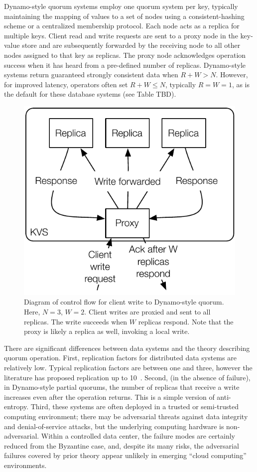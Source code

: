 \documentclass{vldb}
\begin{document}
Dynamo-style quorum systems employ one quorum system per key,
typically maintaining the mapping of values to a set of nodes using a
consistent-hashing scheme or a centralized membership protocol. Each
node acts as a replica for multiple keys.  Client read and write
requests are sent to a proxy node in the key-value store and are
subsequently forwarded by the receiving node to all other nodes
assigned to that key as replicas.  The proxy node acknowledges
operation success when it has heard from a pre-defined number of
replicas.  Dynamo-style systems return guaranteed strongly consistent
data when $R+W > N$.  However, for improved latency, operators often
set $R+W \leq N$, typically $R=W=1$, as is the default for these
database systems (see Table TBD).

\begin{figure}
\centering
\includegraphics[width=.8\columnwidth]{figs/dynamo-quorum.pdf}
\caption{Diagram of control flow for client write to Dynamo-style
  quorum.  Here, $N=3$, $W=2$. Client writes are proxied and sent to
  all replicas. The write succeeds when $W$ replicas respond.  Note
  that the proxy is likely a replica as well, invoking a local write.}
\label{fig:dynamo-quorum}
\end{figure}

There are significant differences between data systems and the theory
describing quorum operation.  First, replication factors for
distributed data systems are relatively low.  Typical replication
factors are between one and three, however the literature has proposed
replication up to 10~\cite{chain-replication}.  Second, (in the
absence of failure), in Dynamo-style partial quorums, the number of
replicas that receive a write increases even after the operation
returns.  This is a simple version of anti-entropy.  Third, these
systems are often deployed in a trusted or semi-trusted computing
environment; there may be adversarial threats against data integrity
and denial-of-service attacks, but the underlying computing hardware
is non-adversarial. Within a controlled data center, the failure modes
are certainly reduced from the Byzantine case, and, despite its many
risks, the adversarial failures covered by prior theory appear
unlikely in emerging ``cloud computing'' environments.
\end{document}

